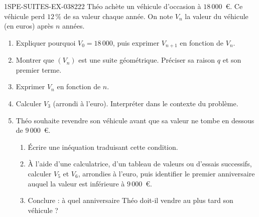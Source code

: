 \begin{exercice}{1SPE-SUITES-EX-038}{2}{22}
Théo achète un véhicule d'occasion à $18\,000$~\euro{}. Ce véhicule perd $12\,\%$ de sa valeur chaque année. On note $V_n$ la valeur du véhicule (en euros) après $n$ années.

\begin{enumerate}
  \item Expliquer pourquoi $V_0 = 18\,000$, puis exprimer $V_{n+1}$ en fonction de $V_n$.

  \item Montrer que $(V_n)$ est une suite géométrique. Préciser sa raison $q$ et son premier terme.

  \item Exprimer $V_n$ en fonction de $n$.

  \item Calculer $V_3$ (arrondi à l'euro). Interpréter dans le contexte du problème.

  \item Théo souhaite revendre son véhicule avant que sa valeur ne tombe en dessous de $9\,000$~\euro{}.
  \begin{enumerate}
    \item Écrire une inéquation traduisant cette condition.
    \item À l'aide d'une calculatrice, d'un tableau de valeurs ou d'essais successifs, calculer $V_5$ et $V_6$, arrondies à l'euro, puis identifier le premier anniversaire auquel la valeur est inférieure à $9\,000$~\euro{}.
    \item Conclure : à quel anniversaire Théo doit-il vendre au plus tard son véhicule ?
  \end{enumerate}
\end{enumerate}
\end{exercice}

